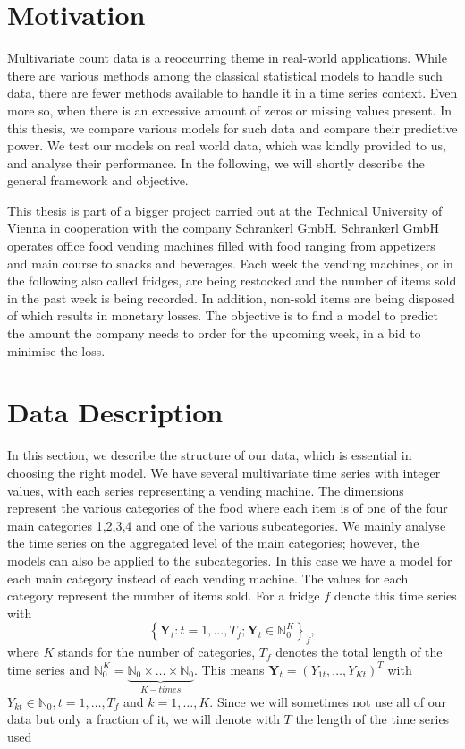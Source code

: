 \section{Motivation}
\label{sec:Motivation}

Multivariate count data is a reoccurring theme in real-world applications. While there are various methods among the classical statistical models to handle such data, there are fewer methods available to handle it in a time series context. Even more so, when there is an excessive amount of zeros or missing values present. In this thesis, we compare various models for such data and compare their predictive power. We test our models on real world data, which was kindly provided to us, and analyse their performance. In the following, we will shortly describe the general framework and objective. 

This thesis is part of a bigger project carried out at the Technical University of Vienna in cooperation with the company Schrankerl GmbH. Schrankerl GmbH operates office food vending machines filled with food ranging from appetizers and main course to snacks and beverages. Each week the vending machines, or in the following also called fridges, are being restocked and the number of items sold in the past week is being recorded. In addition, non-sold items are being disposed of which results in monetary losses. The objective is to find a model to predict the amount the company needs to order for the upcoming week, in a bid to minimise the loss.

\section{Data Description}
\label{sec: Data Description}

In this section, we describe the structure of our data, which is essential in choosing the right model. We have several multivariate time series with integer values, with each series representing a vending machine. The dimensions represent the various categories of the food where each item is of one of the four main categories 1,2,3,4 and one of the various subcategories. We mainly analyse the time series on the aggregated level of the main categories; however, the models can also be applied to the subcategories. In this case we have a model for each main category instead of each vending machine. The values for each category represent the number of items sold. For a fridge $f$ denote this time series with 
%
\begin{equation}
\left\{\bm{Y}_t:t=1,\ldots,T_f; \bm{Y}_t \in \mathbb{N}_0^K \right\}_f,
\label{eq:time series definition}
\end{equation}
%
where $K$ stands for the number of categories, $T_f$ denotes the total length of the time series and $\mathbb{N}_0^K = \underbrace{\mathbb{N}_0 \times \ldots \times \mathbb{N}_0}_{K-times}$. This means $\bm{Y}_t = (Y_{1t},\ldots,Y_{Kt})^T$ with $Y_{kt} \in \mathbb{N}_0, t=1,\ldots,T_f$ and $k=1,\ldots,K$. Since we will sometimes not use all of our data but only a fraction of it, we will denote with $T$ the length of the time series used

